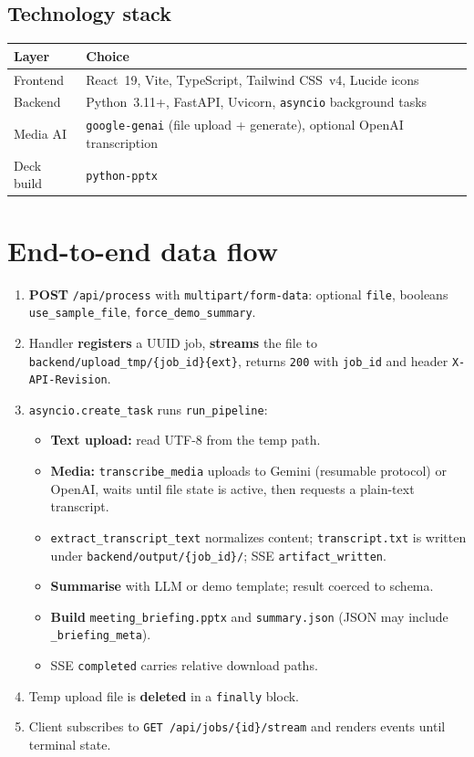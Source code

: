 \documentclass[11pt,a4paper]{article}
\begin{document}
\subsection{Technology stack}
\begin{tabularx}{\linewidth}{@{}lX@{}}
  \toprule
  \textbf{Layer} & \textbf{Choice} \\
  \midrule
  Frontend & React~19, Vite, TypeScript, Tailwind CSS~v4, Lucide icons \\
  Backend & Python~3.11+, FastAPI, Uvicorn, \texttt{asyncio} background tasks \\
  Media AI & \texttt{google-genai} (file upload + generate), optional OpenAI transcription \\
  Deck build & \texttt{python-pptx} \\
  \bottomrule
\end{tabularx}

\section{End-to-end data flow}

\begin{enumerate}[leftmargin=*]
  \item \textbf{POST} \texttt{/api/process} with \texttt{multipart/form-data}: optional \texttt{file}, booleans \texttt{use\_sample\_file}, \texttt{force\_demo\_summary}.
  \item Handler \textbf{registers} a UUID job, \textbf{streams} the file to \texttt{backend/upload\_tmp/\{job\_id\}\{ext\}}, returns \texttt{200} with \texttt{job\_id} and header \texttt{X-API-Revision}.
  \item \texttt{asyncio.create\_task} runs \texttt{run\_pipeline}:
  \begin{itemize}
    \item \textbf{Text upload:} read UTF-8 from the temp path.
    \item \textbf{Media:} \texttt{transcribe\_media} uploads to Gemini (resumable protocol) or OpenAI, waits until file state is active, then requests a plain-text transcript.
    \item \texttt{extract\_transcript\_text} normalizes content; \texttt{transcript.txt} is written under \texttt{backend/output/\{job\_id\}/}; SSE \texttt{artifact\_written}.
    \item \textbf{Summarise} with LLM or demo template; result coerced to schema.
    \item \textbf{Build} \texttt{meeting\_briefing.pptx} and \texttt{summary.json} (JSON may include \texttt{\_briefing\_meta}).
    \item SSE \texttt{completed} carries relative download paths.
  \end{itemize}
  \item Temp upload file is \textbf{deleted} in a \texttt{finally} block.
  \item Client subscribes to \texttt{GET /api/jobs/\{id\}/stream} and renders events until terminal state.
\end{enumerate}
\end{document}
